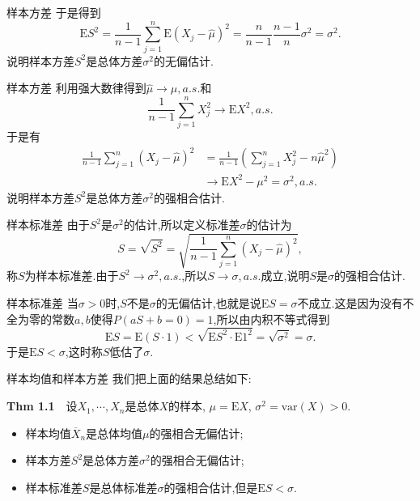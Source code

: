 	\begin{frame}{样本方差}
		于是得到
		\begin{equation}
		\mathrm{E}S^2 = \frac{1}{n-1}\sum_{j=1}^n\mathrm{E}(X_j-\widehat{\mu})^2 = \frac{n}{n-1}\frac{n-1}{n}\sigma^2 = \sigma^2.
		\end{equation}
		说明样本方差$S^2$是总体方差$\sigma^2$的无偏估计.
	\end{frame}	

	\begin{frame}{样本方差}
		利用强大数律得到$\widehat{\mu}\to\mu,a.s.$和
		\begin{equation}
			\frac{1}{n-1}\sum_{j=1}^nX_j^2\to \mathrm{E}X^2,a.s.
		\end{equation}
		于是有
		\begin{equation}
			\begin{split}
				\frac{1}{n-1}\sum_{j=1}^n(X_j-\widehat{\mu})^2 &= \frac{1}{n-1}\left(\sum_{j=1}^n X_j^2 - n\widehat{\mu}^2 \right) \\
				&\to \mathrm{E}X^2 - \mu^2 = \sigma^2,a.s.
			\end{split}
		\end{equation}
		说明样本方差$S^2$是总体方差$\sigma^2$的强相合估计.
	\end{frame}

	\begin{frame}{样本标准差}
		由于$S^2$是$\sigma^2$的估计,所以定义标准差$\sigma$的估计为
		\begin{equation}
			S = \sqrt{S^2} = \sqrt{\frac{1}{n-1}\sum_{j=1}^n(X_j-\widehat{\mu})^2},
		\end{equation}
		称$S$为样本标准差.由于$S^2\to\sigma^2,a.s.$,所以$S\to\sigma,a.s.$成立,说明$S$是$\sigma$的强相合估计.
	\end{frame}

	\begin{frame}{样本标准差}
		当$\sigma>0$时,$S$不是$\sigma$的无偏估计,也就是说$\mathrm{E}S = \sigma$不成立.这是因为没有不全为零的常数$a,b$使得$P(aS+b=0)=1$,所以由内积不等式得到
		\begin{equation}
			\mathrm{E}S = \mathrm{E}(S\cdot 1) < \sqrt{\mathrm{E}S^2\cdot\mathrm{E}1^2} = \sqrt{\sigma^2} = \sigma.
		\end{equation}
		于是$\mathrm{E}S<\sigma$,这时称$S$低估了$\sigma$.
	\end{frame}

	\begin{frame}{样本均值和样本方差}
		我们把上面的结果总结如下:
		\begin{block}{\textbf{Thm 1.1}$\quad$设$X_1,\cdots,X_n$是总体$X$的样本, $\mu = \mathrm{E}X$, $\sigma^2 = \mathrm{var}(X)>0$.}
			\begin{itemize}
				\item 样本均值$\overline{X}_n$是总体均值$\mu$的强相合无偏估计;
				\item 样本方差$S^2$是总体方差$\sigma^2$的强相合无偏估计; 
				\item 样本标准差$S$是总体标准差$\sigma$的强相合估计,但是$\mathrm{E}S<\sigma$.
			\end{itemize}
		\end{block}

	\end{frame}

